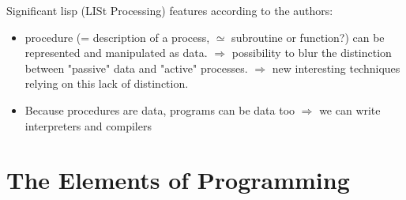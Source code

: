 Significant lisp (LISt Processing) features according to the authors:
\begin{itemize}
\item procedure (= description of a process, $\simeq$ subroutine or function?) can be represented and manipulated as data. $\Rightarrow$ possibility to blur the distinction between "passive" data and "active" processes. $\Rightarrow$ new interesting techniques relying on this lack of distinction. 
\item Because procedures are data, programs can be data too $\Rightarrow$ we can write interpreters and compilers
\end{itemize}

\section{The Elements of Programming}





